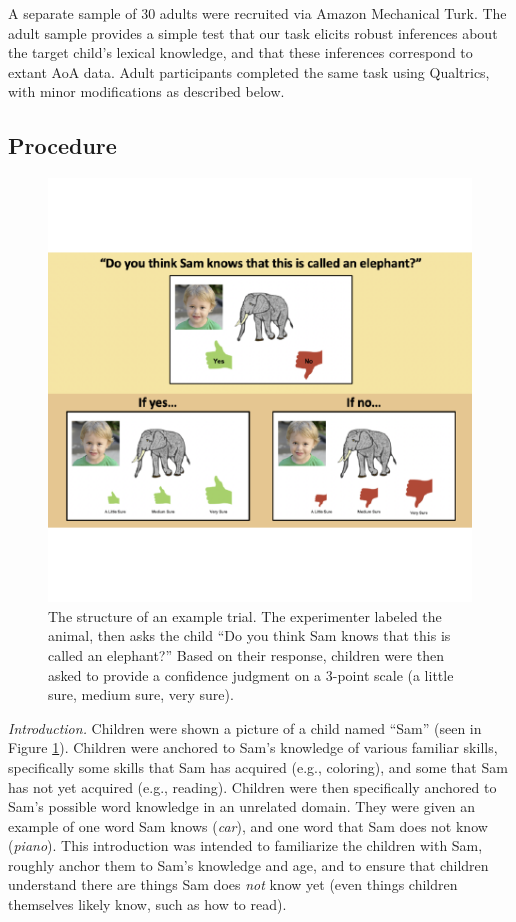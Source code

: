 \documentclass[10pt, letterpaper]{article}
\newenvironment{CodeChunk}{}{}
\begin{document}
A separate sample of 30 adults were recruited via Amazon Mechanical
Turk. The adult sample provides a simple test that our task elicits
robust inferences about the target child's lexical knowledge, and that
these inferences correspond to extant AoA data. Adult participants
completed the same task using Qualtrics, with minor modifications as
described below.

\hypertarget{procedure}{%
\subsection{Procedure}\label{procedure}}

\begin{CodeChunk}
\begin{figure}[tb]

{\centering \includegraphics{figs/task-method-1} 

}

\caption[The structure of an example trial]{The structure of an example trial. The experimenter labeled the animal, then asks the child “Do you think Sam knows that this is called an elephant?” Based on their response, children were then asked to provide a confidence judgment on a 3-point scale (a little sure, medium sure, very sure).}\label{fig:task-method}
\end{figure}
\end{CodeChunk}

\emph{Introduction.} Children were shown a picture of a child named
``Sam'' (seen in Figure \ref{fig:task-method}). Children were anchored
to Sam's knowledge of various familiar skills, specifically some skills
that Sam has acquired (e.g., coloring), and some that Sam has not yet
acquired (e.g., reading). Children were then specifically anchored to
Sam's possible word knowledge in an unrelated domain. They were given an
example of one word Sam knows (\emph{car}), and one word that Sam does
not know (\emph{piano}). This introduction was intended to familiarize
the children with Sam, roughly anchor them to Sam's knowledge and age,
and to ensure that children understand there are things Sam does
\emph{not} know yet (even things children themselves likely know, such
as how to read).
\end{document}
